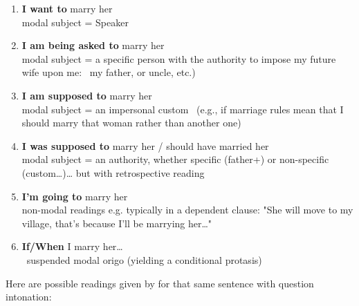 \documentclass[output=paper]{langsci/langscibook}
\begin{document}
\begin{enumerate}[label=\alph*)]
	\item \textbf{I want to} marry her\\modal subject = Speaker
	\item \textbf{I am being asked to} marry her\\modal subject =  a specific person with the authority to impose my future wife upon me:  my father, 				or uncle, etc.)
	\item \textbf{I am supposed to} marry her\\modal subject = an impersonal custom  (e.g., if marriage rules mean that I should marry that woman rather than another one)
	\item \textbf{I was supposed to} marry her / should have married her\\modal subject = an authority, whether specific (father+) or non-specific (custom…)… but with retrospective reading
	\item\label{ex:rumsey:ar15e} \textbf{I'm going to} marry her\\non-modal readings e.g. typically in a dependent clause: "She will move to my village, that's because I'll be marrying her…"
	\item \textbf{If/When} I marry her…\\ suspended modal origo (yielding a conditional protasis)
\end{enumerate}

Here are possible readings given by \citeauthor{Francois2003} for that same sentence with question intonation:
\end{document}
